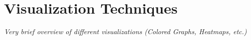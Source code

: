 \section{Visualization Techniques}\label{sec:visualization}
\textit{Very brief overview of different visualizations (Colored Graphs, Heatmaps, etc.)}
